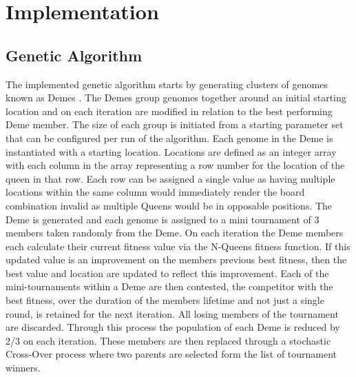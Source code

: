 \documentclass[a4paper,onecolumn,11pt]{article}
\begin{document}
\section{Implementation}
\subsection{Genetic Algorithm}
The implemented genetic algorithm starts by generating clusters of genomes known as Demes \cite{Demes}. The Demes group genomes together around an initial starting location and on each iteration are modified in relation to the best performing Deme member. The size of each group is initiated from a starting parameter set that can be configured per run of the algorithm. Each genome in the Deme is instantiated with a starting location. Locations are defined as an integer array with each column in the array representing a row number for the location of the queen in that row. Each row can be assigned a single value as having multiple locations within the same column would immediately render the board combination invalid as multiple Queens would be in opposable positions. The Deme is generated and each genome is assigned to a mini tournament of 3 members taken randomly from the Deme. On each iteration the Deme members each calculate their current fitness value via the N-Queens fitness function. If this updated value is an improvement on the members previous best fitness, then the best value and location are updated to reflect this improvement. Each of the mini-tournaments within a Deme are then contested, the competitor with the best fitness, over the duration of the members lifetime and not just a single round, is retained for the next iteration. All losing members of the tournament are discarded. Through this process the population of each Deme is reduced by 2/3 on each iteration. These members are then replaced through a stochastic Cross-Over process where two parents are selected form the list of tournament winners.
\end{document}
